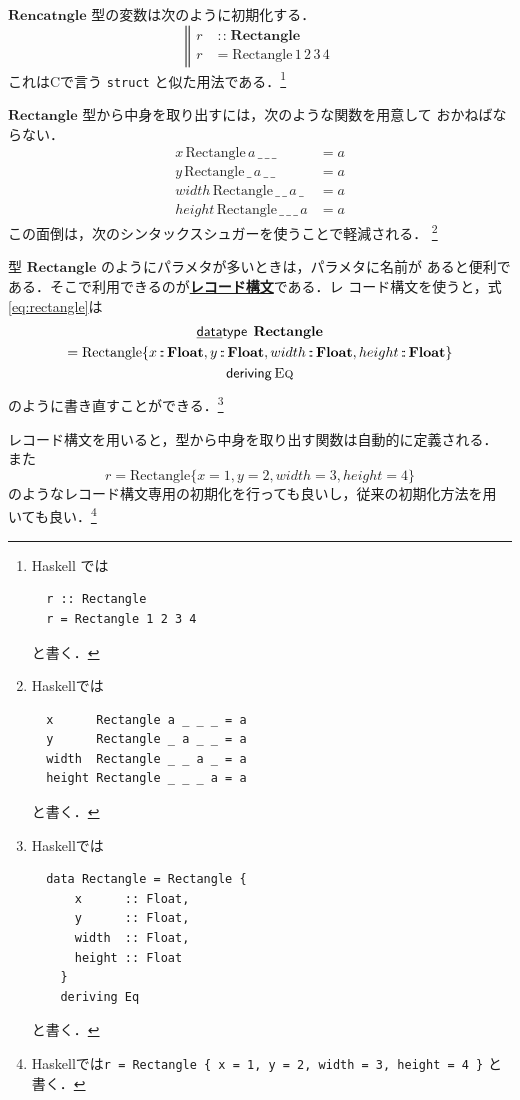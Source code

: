 \documentclass[a5paper,twoside,fleqn,draft]{jsbook}
\newcommand{\programminglanguage}[1]{\textsf{#1}}
\newcommand{\clang}{\programminglanguage{C}}
\newcommand{\haskell}{\programminglanguage{Haskell}}
\newcommand{\keyword}[1]{{\underline{\textbf{#1}}}}
\newcommand{\code}[1]{\texttt{#1}}
\newcommand{\mBrace}{\Vert}
\newcommand{\mKeyword}[1]{\mathsf{#1}}
\newcommand{\mKeywordUnderline}[1]{\text{\underline{\textsf{#1}}}}
\newcommand{\mDataTypeKeyword}{\mKeywordUnderline{data}\mKeyword{type}}
\newcommand{\mDerivingKeyword}{\mKeyword{deriving}}
\DeclareMathOperator{\mDataType}{\mDataTypeKeyword}
\DeclareMathOperator{\mDeriving}{\mDerivingKeyword}
\DeclareMathOperator{\mIn}{{:\!:}}
\newcommand{\mType}[1]{\mathbf{#1}} %
\newcommand{\mFloatType}{\mType{Float}}
\newcommand{\mValueConstructor}[1]{\mathrm{#1}}
\newcommand{\mValueWith}[2]{\mValueConstructor{#1}\,#2}
\newcommand{\mValueRecordBeginWith}[1]{\mValueConstructor{#1}\{}
\newcommand{\mValueRecordEnd}{\}}
\newcommand{\mValueRecordWith}[2]{\mValueRecordBeginWith{#1}{#2}\mValueRecordEnd}
\newcommand{\mTypeClass}[1]{\textsc{#1}} %
\newcommand{\mEqTypeClass}{\mTypeClass{Eq}}
\begin{document}
$\mType{Rencatngle}$ 型の変数は次のように初期化する．
\begin{equation}
  \left\mBrace
  \begin{aligned}
    r&\mIn\mType{Rectangle}\\
    r&=\mValueWith{Rectangle}{1\,2\,3\,4}
  \end{aligned}
  \right.
\end{equation}
これは\clang で言う \code{struct} と似た用法である．\footnote{\haskell
では
\begin{verbatim}
  r :: Rectangle
  r = Rectangle 1 2 3 4
\end{verbatim}
と書く．}

$\mType{Rectangle}$ 型から中身を取り出すには，次のような関数を用意して
おかねばならない．
\begin{align}
  x\,\mValueWith{Rectangle}{a\,\_\,\_\,\_}
  &=a\\
  y\,\mValueWith{Rectangle}{\_\,a\,\_\,\_}
  &=a\\
  width\,\mValueWith{Rectangle}{\_\,\_\,a\,\_}
  &=a\\
  height\,\mValueWith{Rectangle}{\_\,\_\,\_\,a}
  &=a
\end{align}
この面倒は，次のシンタックスシュガーを使うことで軽減される．
\footnote{\haskell では
\begin{verbatim}
  x      Rectangle a _ _ _ = a
  y      Rectangle _ a _ _ = a
  width  Rectangle _ _ a _ = a
  height Rectangle _ _ _ a = a
\end{verbatim}
と書く．}

型 $\mType{Rectangle}$ のようにパラメタが多いときは，パラメタに名前が
あると便利である．そこで利用できるのが\keyword{レコード構文}である．レ
コード構文を使うと，式\eqref{eq:rectangle}は
\begin{multline}
  \mDataType\;\mType{Rectangle}\\
  =\mValueRecordBeginWith{Rectangle}
  x\mIn\mFloatType,
  y\mIn\mFloatType,
  width\mIn\mFloatType,
  height\mIn\mFloatType
  \mValueRecordEnd\\
  \mDeriving\mEqTypeClass
\end{multline}
のように書き直すことができる．\footnote{\haskell では
\begin{verbatim}
  data Rectangle = Rectangle {
      x      :: Float,
      y      :: Float,
      width  :: Float,
      height :: Float
    }
    deriving Eq
\end{verbatim}
と書く．}

レコード構文を用いると，型から中身を取り出す関数は自動的に定義される．
また
\begin{equation}
  r=
  \mValueRecordWith{Rectangle}{
    x=1,
    y=2,
    width=3,
    height=4
  }
\end{equation}
のようなレコード構文専用の初期化を行っても良いし，従来の初期化方法を用
いても良い．\footnote{\haskell では\code{r = Rectangle \{ x = 1, y =
    2, width = 3, height = 4 \}} と書く．}
\end{document}
